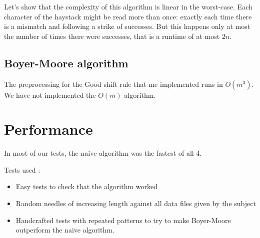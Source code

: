 \documentclass[a4paper,11pt]{article}
\begin{document}
Let's show that the complexity of this algorithm is linear in the worst-case. Each character of the haystack might be read more than once: exactly each time there is a mismatch and following a strike of successes. But this happens only at most the number of times there were successes, that is a runtime of at most $2n$.

\subsection{Boyer-Moore algorithm}

The preprocessing for the Good shift rule that me implemented runs in $O(m^3)$. We have not implemented the $O(m)$ algorithm.

 
 \section{Performance}
 
 In most of our tests, the naive algorithm was the fastest of all 4.
 
 Tests used :
 \begin{itemize}
 \item Easy tests to check that the algorithm worked
 \item Random needles of increasing length against all data files given by the subject
 \item Handcrafted tests with repeated patterns to try to make Boyer-Moore outperform the naive algorithm.
 \end{itemize}
 
 
 
 
 
\end{document}
